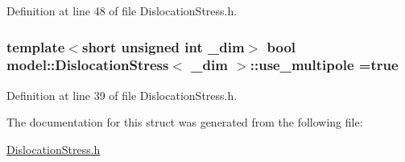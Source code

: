 Definition at line 48 of file Dislocation\+Stress.\+h.

\hypertarget{structmodel_1_1_dislocation_stress_a9979f89edcb85c3c615dcbfd061f8bbe}{}
\subsubsection[{use\+\_\+multipole}]{\setlength{\rightskip}{0pt plus 5cm}template$<$short unsigned int \+\_\+dim$>$ bool {\bf model\+::\+Dislocation\+Stress}$<$ \+\_\+dim $>$\+::use\+\_\+multipole =true\hspace{0.3cm}{\ttfamily [static]}}\label{structmodel_1_1_dislocation_stress_a9979f89edcb85c3c615dcbfd061f8bbe}


Definition at line 39 of file Dislocation\+Stress.\+h.



The documentation for this struct was generated from the following file\+:\begin{DoxyCompactItemize}
\item 
\hyperlink{_dislocation_stress_8h}{Dislocation\+Stress.\+h}\end{DoxyCompactItemize}
